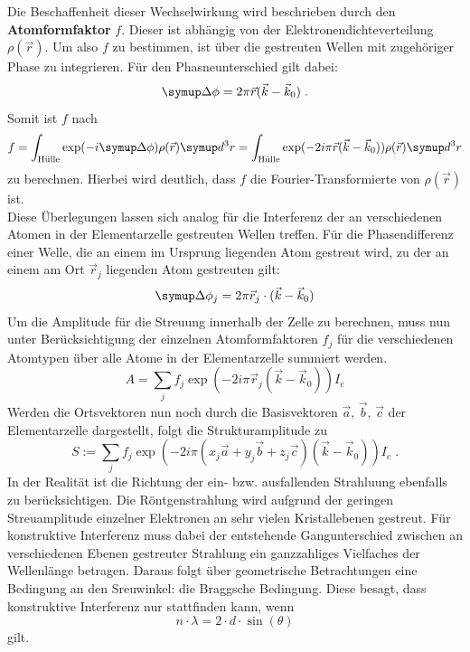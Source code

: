 Die Beschaffenheit dieser Wechselwirkung wird beschrieben durch den \textbf{Atomformfaktor} $f$. Dieser ist abhängig von
der Elektronendichteverteilung $\rho(\vec{r})$. Um also $f$ zu bestimmen, ist über die gestreuten Wellen mit zugehöriger
Phase zu integrieren. Für den Phasneunterschied gilt dabei:
%
\begin{equation}
  \upD\phi=2\pi\vec{r}(\vec{k}-\vec{k}_0) \; .
\end{equation}
%
Somit ist $f$ nach
%
\begin{equation}
  f=\int_\text{Hülle}\exp(-i\upD\phi)\rho(\vec{r})\upd^3r=\int_\text{Hülle}\exp(-2i\pi\vec{r}(\vec{k}-\vec{k}_0))\rho(\vec{r})\upd^3r
\end{equation}
%
zu berechnen. Hierbei wird deutlich, dass $f$ die Fourier-Transformierte von $\rho(\vec{r})$ ist.\\
Diese Überlegungen lassen sich analog für die Interferenz der an verschiedenen Atomen in der Elementarzelle gestreuten Wellen treffen.
Für die Phasendifferenz einer Welle, die an einem im Ursprung liegenden Atom gestreut wird, zu der an einem am Ort $\vec{r}_j$
liegenden Atom gestreuten gilt:
%
\begin{equation}
  \upD\phi_j=2\pi\vec{r}_j\cdot(\vec{k}-\vec{k}_0)
\end{equation}
%
Um die Amplitude für die Streuung innerhalb der Zelle zu berechnen, muss nun unter Berücksichtigung der einzelnen Atomformfaktoren
$f_j$ für die verschiedenen Atomtypen über alle Atome in der Elementarzelle summiert werden.
%
\begin{equation}
  A=\sum_jf_j\exp(-2i\pi\vec{r}_j(\vec{k}-\vec{k}_0))I_e
\end{equation}
%
Werden die Ortsvektoren nun noch durch die Basisvektoren $\vec{a},\,\vec{b},\,\vec{c}$ der Elementarzelle dargestellt, folgt
die Strukturamplitude zu
%
\begin{equation}
  S:=\sum_jf_j\exp(-2i\pi(x_j\vec{a}+y_j\vec{b}+z_j\vec{c})(\vec{k}-\vec{k}_0))I_e \; .
  \label{eq:strukturamplitude}
\end{equation}
%
In der Realität ist die Richtung der ein- bzw. ausfallenden Strahluung ebenfalls zu berücksichtigen. Die Röntgenstrahlung wird aufgrund
der geringen Streuamplitude einzelner Elektronen an sehr vielen Kristallebenen gestreut. Für konstruktive Interferenz muss dabei der
entstehende Gangunterschied zwischen an verschiedenen Ebenen gestreuter Strahlung ein ganzzahliges Vielfaches der Wellenlänge betragen.
Daraus folgt über geometrische Betrachtungen eine Bedingung an den Sreuwinkel: die Braggsche Bedingung. Diese besagt, dass konstruktive
Interferenz nur stattfinden kann, wenn
%
\begin{equation}
  n\cdot\lambda=2\cdot d\cdot\sin(\theta)
\end{equation}
%
gilt.
%
